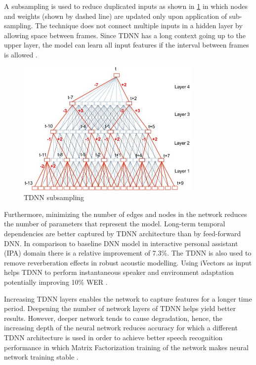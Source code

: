 A subsampling is used to reduce duplicated inputs as shown in \ref{fig:tdnn-subsampling} in which nodes and weights (shown by dashed line) are updated only upon application of sub-sampling. The technique does not connect multiple inputs in a hidden layer by allowing space between frames. Since TDNN has a long context going up to the upper layer, the model can learn all input features if the interval between frames is allowed \cite{ritter_neural_2019}. 

\begin{figure}[h!]
    \centering
    \includegraphics[width=0.8\textwidth]{img/Tdnn-subsampling.jpg}
    \caption{TDNN subsampling \cite{ritter_neural_2019}}
    \label{fig:tdnn-subsampling}
\end{figure}

Furthermore, minimizing the number of edges and nodes in the network reduces the number of parameters that represent the model. Long-term temporal dependencies are better captured by TDNN architecture than by feed-forward DNN. In comparison to baseline DNN model in interactive personal assistant (IPA) domain there is a relative improvement of 7.3\%.  The TDNN is also used to remove reverberation effects in robust acoustic modelling. Using iVectors as input helps TDNN to perform instantaneous speaker and environment adaptation potentially improving 10\% WER \cite{yeh_taiwanese_2020}.

Increasing TDNN layers enables the network to capture features for a longer time period. Deepening the number of network layers of TDNN helps yield better results. However, deeper network tends to cause degradation, hence, the increasing depth of the neural network reduces accuracy for which a different TDNN architecture is used  in order to achieve better speech recognition performance in which Matrix Factorization training of the network makes neural network training stable \cite{povey_semi-orthogonal_2018}.

